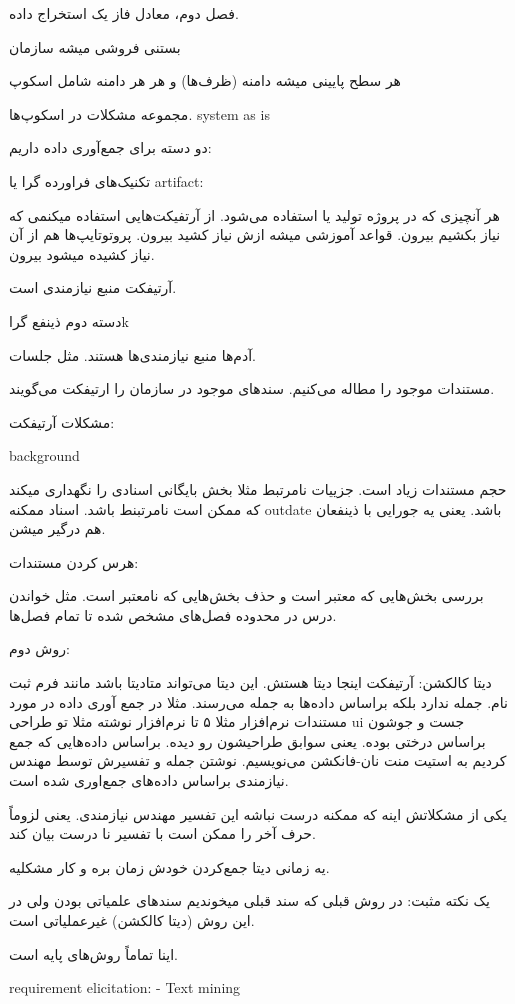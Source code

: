 فصل دوم، معادل فاز یک استخراج داده.

بستنی فروشی میشه سازمان

هر سطح پایینی میشه دامنه (ظرف‌ها)
و هر هر دامنه شامل اسکوپ

مجموعه مشکلات در اسکوپ‌ها. system as is

دو دسته برای جمع‌آوری داده داریم:

تکنیک‌های فراورده گرا یا artifact:

هر آنچیزی که در پروژه تولید یا استفاده می‌شود. از آرتفیکت‌هایی استفاده میکنمی که
نیاز بکشیم بیرون. قواعد آموزشی میشه ازش نیاز کشید بیرون. پروتوتایپ‌ها هم از آن
نیاز کشیده میشود بیرون.

آرتیفکت منبع نیازمندی است.

دسته دوم ذینفع گراk

آدم‌ها منبع نیازمندی‌ها هستند. مثل جلسات.

مستندات موجود را مطاله می‌کنیم. سند‌های موجود در سازمان را ارتیفکت می‌گویند.

مشکلات آرتیفکت:

background

حجم مستندات زیاد است.
جزيیات نامرتبط مثلا بخش بایگانی اسنادی را نگهداری میکند که ممکن است نامرتبنط
باشد.
اسناد ممکنه outdate باشد. یعنی یه جورایی با ذینفعان هم درگیر میشن.

هرس کردن مستندات:

بررسی بخش‌هایی که معتبر است و حذف بخش‌هایی که نامعتبر است. مثل خواندن درس در
محدوده فصل‌های مشخص شده تا تمام فصل‌ها.

روش دوم:

دیتا کالکشن: آرتیفکت اینجا دیتا هستش. این دیتا می‌تواند متادیتا باشد مانند فرم
ثبت نام. جمله ندارد بلکه براساس داده‌ها به جمله می‌رسند. مثلا در جمع آوری داده
در مورد مستندات نرم‌افزار مثلا ۵ تا نرم‌افزار نوشته مثلا تو طراحی ui جست و جوشون
براساس درختی بوده. یعنی سوابق طراحیشون رو دیده. براساس داده‌هایی که جمع کردیم به
استیت منت نان-فانکشن می‌نویسیم. نوشتن جمله و تفسیرش توسط مهندس نیازمندی براساس
داده‌های جمع‌اوری شده است.

یکی از مشکلاتش اینه که ممکنه درست نباشه این تفسیر مهندس نیازمندی. یعنی لزوماً
حرف آخر را ممکن است با تفسیر نا درست بیان کند.

یه زمانی دیتا جمع‌کردن خودش زمان بره و کار مشکلیه. 

یک نکته مثبت: 
در روش قبلی که سند قبلی میخوندیم سند‌های علمیاتی بودن ولی در این روش (دیتا
کالکشن) غیرعملیاتی است.

اینا تماماً روش‌‌های پایه است. 

requirement elicitation:
- Text mining

